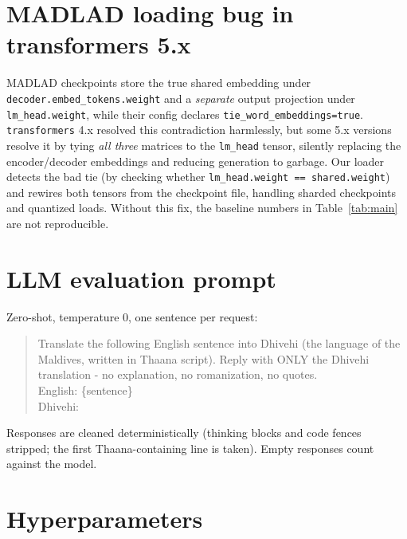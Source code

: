 \documentclass[10pt,twocolumn]{article}
\begin{document}
\renewcommand{\bibfont}{\footnotesize}
\setlength{\bibsep}{3pt}



\appendix

\section{MADLAD loading bug in transformers 5.x}
\label{app:bug}

MADLAD checkpoints store the true shared embedding under
\texttt{decoder.embed\_tokens.weight} and a \emph{separate} output
projection under \texttt{lm\_head.weight}, while their config declares
\texttt{tie\_word\_embeddings=true}. \texttt{transformers} 4.x resolved
this contradiction harmlessly, but some 5.x versions resolve it by tying
\emph{all three} matrices to the \texttt{lm\_head} tensor, silently
replacing the encoder/decoder embeddings and reducing generation to
garbage. Our loader detects the bad tie (by checking whether
\texttt{lm\_head.weight == shared.weight}) and rewires both tensors from
the checkpoint file, handling sharded checkpoints and quantized loads.
Without this fix, the baseline numbers in Table~\ref{tab:main} are not
reproducible.

\section{LLM evaluation prompt}
\label{app:prompt}

Zero-shot, temperature 0, one sentence per request:

\begin{quote}\small\ttfamily
Translate the following English sentence into Dhivehi (the language of
the Maldives, written in Thaana script). Reply with ONLY the Dhivehi
translation - no explanation, no romanization, no quotes.\\[2pt]
English: \{sentence\}\\
Dhivehi:
\end{quote}

Responses are cleaned deterministically (thinking blocks and code fences
stripped; the first Thaana-containing line is taken). Empty responses
count against the model.

\section{Hyperparameters}
\label{app:hparams}
\end{document}
